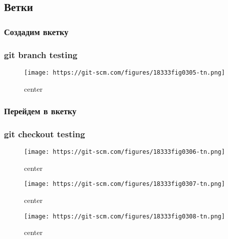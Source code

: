 \documentclass[11pt]{article}
\makeatletter
\def\maxwidth{\ifdim\Gin@nat@width>\linewidth\linewidth
    \else\Gin@nat@width\fi}
\let\Oldincludegraphics\includegraphics
\renewcommand{\includegraphics}[1]{\Oldincludegraphics[width=.8\maxwidth]{#1}}
\makeatother
\begin{document}
    \hypertarget{ux432ux435ux442ux43aux438}{%
\subsection{Ветки}\label{ux432ux435ux442ux43aux438}}

\hypertarget{ux441ux43eux437ux434ux430ux434ux438ux43c-ux432ux43aux435ux442ux43aux443}{%
\subsubsection{Создадим
вкетку}\label{ux441ux43eux437ux434ux430ux434ux438ux43c-ux432ux43aux435ux442ux43aux443}}

\hypertarget{git-branch-testing}{%
\subsubsection{git branch testing}\label{git-branch-testing}}

    \begin{figure}
\centering
\texttt{[image: https://git-scm.com/figures/18333fig0305-tn.png]}
\caption{center}
\end{figure}

    \hypertarget{ux43fux435ux440ux435ux439ux434ux435ux43c-ux432-ux432ux43aux435ux442ux43aux443}{%
\subsubsection{Перейдем в
вкетку}\label{ux43fux435ux440ux435ux439ux434ux435ux43c-ux432-ux432ux43aux435ux442ux43aux443}}

\hypertarget{git-checkout-testing}{%
\subsubsection{git checkout testing}\label{git-checkout-testing}}

\begin{figure}
\centering
\texttt{[image: https://git-scm.com/figures/18333fig0306-tn.png]}
\caption{center}
\end{figure}

    \begin{figure}
\centering
\texttt{[image: https://git-scm.com/figures/18333fig0307-tn.png]}
\caption{center}
\end{figure}

    \begin{figure}
\centering
\texttt{[image: https://git-scm.com/figures/18333fig0308-tn.png]}
\caption{center}
\end{figure}
\end{document}
